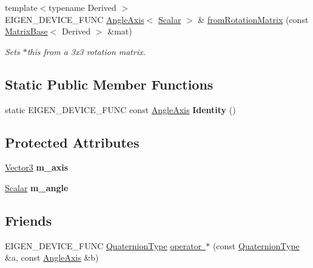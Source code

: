 \begin{DoxyCompactItemize}
\item 
\mbox{\label{class_eigen_1_1_angle_axis_a1b8990c0cca381b5787644c87073fe70}} 
{\footnotesize template$<$typename Derived $>$ }\\E\+I\+G\+E\+N\+\_\+\+D\+E\+V\+I\+C\+E\+\_\+\+F\+U\+NC \mbox{\hyperlink{class_eigen_1_1_angle_axis}{Angle\+Axis}}$<$ \mbox{\hyperlink{class_eigen_1_1_angle_axis_acd9b10692d7d726b28670e4d3a282fe8}{Scalar}} $>$ \& \mbox{\hyperlink{class_eigen_1_1_angle_axis_a1b8990c0cca381b5787644c87073fe70}{from\+Rotation\+Matrix}} (const \mbox{\hyperlink{class_eigen_1_1_matrix_base}{Matrix\+Base}}$<$ Derived $>$ \&mat)
\begin{DoxyCompactList}\small\item\em Sets {\ttfamily $\ast$this} from a 3x3 rotation matrix. \end{DoxyCompactList}\end{DoxyCompactItemize}
\subsection*{Static Public Member Functions}
\begin{DoxyCompactItemize}
\item 
\mbox{\label{class_eigen_1_1_angle_axis_a8adfaaace46b8c174257c5f791fdbf36}} 
static E\+I\+G\+E\+N\+\_\+\+D\+E\+V\+I\+C\+E\+\_\+\+F\+U\+NC const \mbox{\hyperlink{class_eigen_1_1_angle_axis}{Angle\+Axis}} {\bfseries Identity} ()
\end{DoxyCompactItemize}
\subsection*{Protected Attributes}
\begin{DoxyCompactItemize}
\item 
\mbox{\label{class_eigen_1_1_angle_axis_a3e90efdbc2cd9003aeb01eb4fdd5533d}} 
\mbox{\hyperlink{class_eigen_1_1_matrix}{Vector3}} {\bfseries m\+\_\+axis}
\item 
\mbox{\label{class_eigen_1_1_angle_axis_af5ec2ec29583a78e217ca0db445a2728}} 
\mbox{\hyperlink{class_eigen_1_1_angle_axis_acd9b10692d7d726b28670e4d3a282fe8}{Scalar}} {\bfseries m\+\_\+angle}
\end{DoxyCompactItemize}
\subsection*{Friends}
\begin{DoxyCompactItemize}
\item 
E\+I\+G\+E\+N\+\_\+\+D\+E\+V\+I\+C\+E\+\_\+\+F\+U\+NC \mbox{\hyperlink{class_eigen_1_1_quaternion}{Quaternion\+Type}} \mbox{\hyperlink{class_eigen_1_1_angle_axis_a1412c320ba2c12c3cd3746f796d1dc11}{operator $\ast$}} (const \mbox{\hyperlink{class_eigen_1_1_quaternion}{Quaternion\+Type}} \&a, const \mbox{\hyperlink{class_eigen_1_1_angle_axis}{Angle\+Axis}} \&b)
\end{DoxyCompactItemize}


